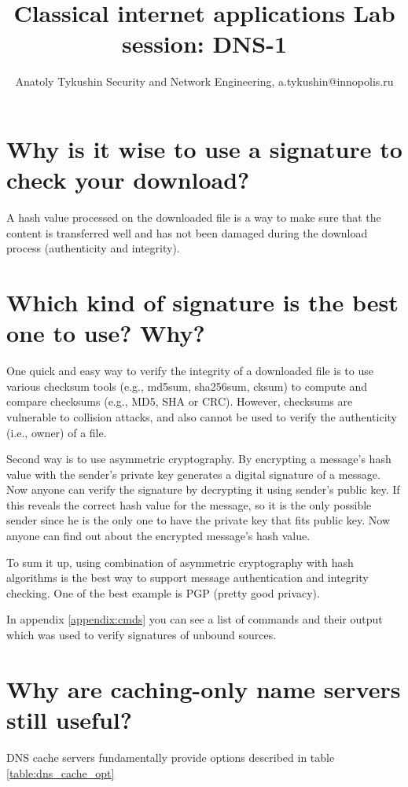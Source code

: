 \documentclass[a4paper]{article}
\title{Classical internet applications
\newline Lab session: DNS-1}
\author{Anatoly Tykushin \small { Security and Network Engineering, a.tykushin@innopolis.ru}}
\newcommand\tab[1][1cm]{\hspace*{#1}}
\begin{document}
\maketitle
\tableofcontents 

\section{Why is it wise to use a signature to check your download?}
\tab A hash value processed on the downloaded file is a way to make sure that the content is transferred well and has not been damaged during the download process (authenticity and integrity).

\section{Which kind of signature is the best one to use? Why?}

\tab One quick and easy way to verify the integrity of a downloaded file is to use various checksum tools (e.g., md5sum, sha256sum, cksum) to compute and compare checksums (e.g., MD5, SHA or CRC). However, checksums are vulnerable to collision attacks, and also cannot be used to verify the authenticity (i.e., owner) of a file.

Second way is to use asymmetric cryptography. By encrypting a message's hash value with the sender's private key  generates a digital signature of a message. Now anyone can verify the signature by decrypting it using sender's public key. If this reveals the correct hash value for the message, so it is the only possible sender since he is the only one to have the private key that fits public key. Now anyone can find out about the encrypted message's hash value.

To sum it up, using combination of asymmetric cryptography with hash algorithms is the best way to support message authentication and integrity checking. One of the best example is PGP (pretty good privacy).

In appendix \ref{appendix:cmds} you can see a list of commands and their output which was used to verify signatures of unbound sources.

\newpage
\section{Why are caching-only name servers still useful?}

\tab DNS cache servers fundamentally provide options described in table \ref{table:dns_cache_opt}
\end{document}
